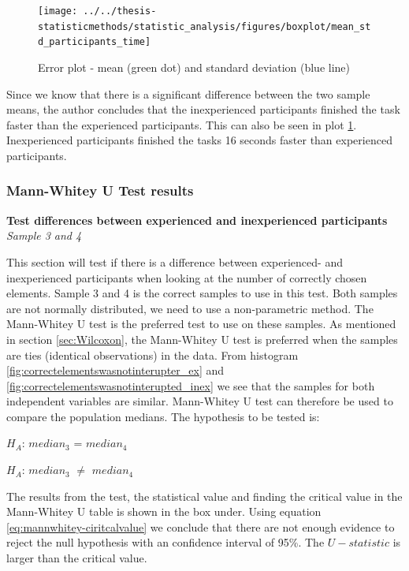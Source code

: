 \begin{figure}[H]
	\centering
	\texttt{[image: ../../thesis-statisticmethods/statistic\_analysis/figures/boxplot/mean\_std\_participants\_time]}
	\caption{Error plot - mean (green dot) and standard deviation (blue line)}
	\label{fig:meanstdparticipantstime}
\end{figure}

Since we know that there is a significant difference between the two sample means, the author concludes that the inexperienced participants finished the task faster than the experienced participants. This can also be seen in plot \ref{fig:meanstdparticipantstime}. Inexperienced participants finished the tasks 16 seconds faster than experienced participants. \newline

\subsubsection{Mann-Whitey U Test results}

\textbf{Test differences between experienced and inexperienced participants}\\
\textit{Sample 3 and 4}\newline

This section will test if there is a difference between experienced- and inexperienced participants when looking at the number of correctly chosen elements. Sample 3 and 4 is the correct samples to use in this test. Both samples are not normally distributed, we need to use a non-parametric method. The Mann-Whitey U test is the preferred test to use on these samples. As mentioned in section \ref{sec:Wilcoxon}, the Mann-Whitey U test is preferred when the samples are ties (identical observations) in the data. From histogram \ref{fig:correctelementswasnotinterupter_ex} and \ref{fig:correctelementswasnotinterupted_inex} we see that the samples for both independent variables are similar. Mann-Whitey U test can therefore be used to compare the population medians. The hypothesis to be tested is:\\[0.3cm]

\centerline{$H_{A}$: $median_3$ = $median_4$}
\centerline{$H_{A}$: $median_3$ $\neq$ $median_4$}

The results from the test, the statistical value and finding the critical value in the Mann-Whitey U table is shown in the box under. Using equation \ref{eq:mannwhitey-ciritcalvalue} we conclude that there are not enough evidence to reject the null hypothesis with an confidence interval of 95\%. The $U-statistic$ is larger than the critical value. 

